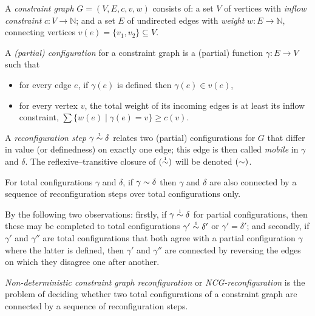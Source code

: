 \documentclass[conference]{IEEEtran}
\let\capsabbrev=\uppercase
\begin{document}
\begin{definition} 
A \emph{constraint graph} $G=(V,E,c,v,w)$ consists of: a set $V$ of vertices with \emph{inflow constraint} $c\colon V\to\mathbb N$; and a set $E$ of undirected edges with \emph{weight} $w\colon E\to\mathbb N$, connecting vertices $v(e)=\{v_1,v_2\}\subseteq V$.

\smallskip

A \emph{(partial) configuration} for a constraint graph is a (partial) function $\gamma\colon E\to V$ such that
\begin{itemize}
	\item
for every edge $e$, if $\gamma(e)$ is defined then $\gamma(e)\in v(e)$,
	\item
for every vertex $v$, the total weight of its incoming edges is at least its inflow constraint, 
$\sum\{w(e)\mid\gamma(e)=v\}\geq c(v)$.
\end{itemize} 

\smallskip
A \emph{reconfiguration step} $\gamma\perm*\delta$ relates two (partial) configurations for $G$ that differ in value (or definedness) on exactly one edge; this edge is then called \emph{mobile} in $\gamma$ and $\delta$.
%
The reflexive--transitive closure of $(\perm*)$ will be denoted $(\perm)$.
%
\end{definition}


\begin{proposition}
\label{prop:partial simulates total reconfiguration}
For total configurations $\gamma$ and $\delta$, if $\gamma\perm\delta$ then $\gamma$ and $\delta$ are also connected by a sequence of reconfiguration steps over total configurations only.
\end{proposition}


\begin{IEEEproof}
By the following two observations: firstly, 
%
if $\gamma\perm*\delta$ for partial configurations, then these may be completed to total configurations $\gamma'\perm*\delta'$ or $\gamma'=\delta'$; and secondly,
%
if $\gamma'$ and $\gamma''$ are total configurations that both agree with a partial configuration $\gamma$ where the latter is defined, then $\gamma'$ and $\gamma''$ are connected by reversing the edges on which they disagree one after another.
%
\end{IEEEproof}


\emph{Non-deterministic constraint graph reconfiguration} or \emph{\capsabbrev{ncg}-reconfiguration} is the problem of deciding whether two total configurations of a constraint graph are connected by a sequence of reconfiguration steps.
%
\end{document}
